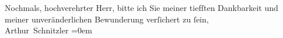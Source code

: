 \pstart
           Nochmals, hochverehrter Herr, bitte ich Sie meiner tiefſten Dankbarkeit und
               meiner unveränderlichen Bewunderung verſichert zu{ }ſein,{\\[\baselineskip]}\spacefill\mbox{Arthur Schnitzler}\pend
           \leftskip=0em{}\endnumbering{}  \newcommand{\dateiname}{L00336}\newcommand{\titel}{Arthur Schnitzler an Georg Brandes, 12. 6. 1894}\newcommand{\editorInnen}{Martin Anton Müller und Gerd-Hermann Susen}
